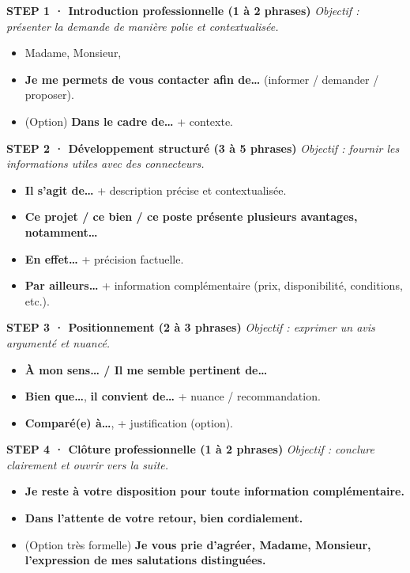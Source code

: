 \documentclass[12pt,a4paper]{article}
\begin{document}

\begin{tcolorbox}[title=\textbf{VERSION FORMELLE · C1 (professionnel / institution)}]

\textbf{STEP 1 · Introduction professionnelle (1 à 2 phrases)}
\emph{Objectif : présenter la demande de manière polie et contextualisée.}
\begin{itemize}
  \item Madame, Monsieur,
  \item \textbf{Je me permets de vous contacter afin de…} (informer / demander / proposer).
  \item (Option) \textbf{Dans le cadre de…} + contexte.
\end{itemize}

\textbf{STEP 2 · Développement structuré (3 à 5 phrases)}
\emph{Objectif : fournir les informations utiles avec des connecteurs.}
\begin{itemize}
  \item \textbf{Il s'agit de…} + description précise et contextualisée.
  \item \textbf{Ce projet / ce bien / ce poste présente plusieurs avantages, notamment…}
  \item \textbf{En effet…} + précision factuelle.
  \item \textbf{Par ailleurs…} + information complémentaire (prix, disponibilité, conditions, etc.).
\end{itemize}

\textbf{STEP 3 · Positionnement (2 à 3 phrases)}
\emph{Objectif : exprimer un avis argumenté et nuancé.}
\begin{itemize}
  \item \textbf{À mon sens… / Il me semble pertinent de…}
  \item \textbf{Bien que…}, \textbf{il convient de…} + nuance / recommandation.
  \item \textbf{Comparé(e) à…}, + justification (option).
\end{itemize}

\textbf{STEP 4 · Clôture professionnelle (1 à 2 phrases)}
\emph{Objectif : conclure clairement et ouvrir vers la suite.}
\begin{itemize}
  \item \textbf{Je reste à votre disposition pour toute information complémentaire.}
  \item \textbf{Dans l'attente de votre retour,} \textbf{bien cordialement.}
  \item (Option très formelle) \textbf{Je vous prie d'agréer, Madame, Monsieur, l'expression de mes salutations distinguées.}
\end{itemize}

\end{tcolorbox}
\end{document}
